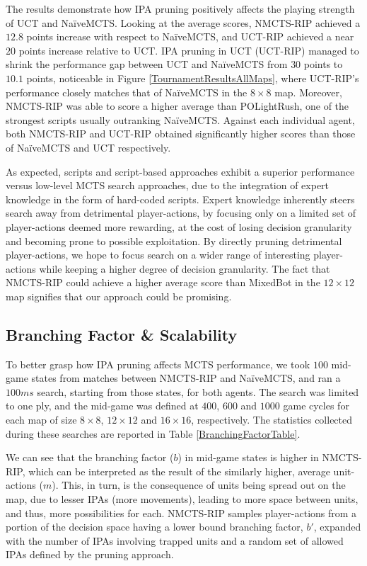 \documentclass[conference]{IEEEtran}
\begin{document}
The results demonstrate how IPA pruning positively affects the playing strength of UCT and NaïveMCTS. Looking at the average scores, NMCTS-RIP achieved a $12.8$ points increase with respect to NaïveMCTS, and UCT-RIP achieved a near $20$ points increase relative to UCT. IPA pruning in UCT (UCT-RIP) managed to shrink the performance gap between UCT and NaïveMCTS from $30$ points to $10.1$ points, noticeable in Figure \ref{TournamentResultsAllMaps}, where UCT-RIP's performance closely matches that of NaïveMCTS in the $8\times8$ map. Moreover, NMCTS-RIP was able to score a higher average than POLightRush, one of the strongest scripts usually outranking NaïveMCTS. Against each individual agent, both NMCTS-RIP and UCT-RIP obtained significantly higher scores than those of NaïveMCTS and UCT respectively.

As expected, scripts and script-based approaches exhibit a superior performance versus low-level MCTS search approaches, due to the integration of expert knowledge in the form of hard-coded scripts. Expert knowledge inherently steers search away from detrimental player-actions, by focusing only on a limited set of player-actions deemed more rewarding, at the cost of losing decision granularity and becoming prone to possible exploitation. By directly pruning detrimental player-actions, we hope to focus search on a wider range of interesting player-actions while keeping a higher degree of decision granularity. The fact that NMCTS-RIP could achieve a higher average score than MixedBot in the $12\times12$ map signifies that our approach could be promising.


\subsection{Branching Factor \& Scalability}

To better grasp how IPA pruning affects MCTS performance, we took $100$ mid-game states from matches between NMCTS-RIP and NaïveMCTS, and ran a $100ms$ search, starting from those states, for both agents. The search was limited to one ply, and the mid-game was defined at $400$, $600$ and $1000$ game cycles for each map of size $8\times8$, $12\times12$ and $16\times16$, respectively. The statistics collected during these searches are reported in Table \ref{BranchingFactorTable}.

We can see that the branching factor ($b$) in mid-game states is higher in NMCTS-RIP, which can be interpreted as the result of the similarly higher, average unit-actions ($m$). This, in turn, is the consequence of units being spread out on the map, due to lesser IPAs (more movements), leading to more space between units, and thus, more possibilities for each. NMCTS-RIP samples player-actions from a portion of the decision space having a lower bound branching factor, $b'$, expanded with the number of IPAs involving trapped units and a random set of allowed IPAs defined by the pruning approach.
\end{document}
